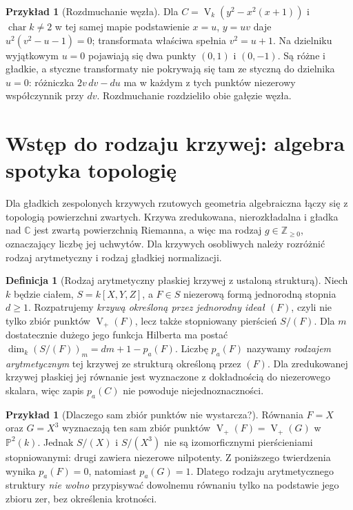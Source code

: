 \documentclass[11pt,a4paper,openany]{report}
\numberwithin{equation}{section}
\theoremstyle{plain}
\theoremstyle{definition}
\newtheorem{definicja}[twierdzenie]{Definicja}
\newtheorem{przyklad}[twierdzenie]{Przykład}
\theoremstyle{remark}
\newcommand{\Z}{\mathbb Z}
\newcommand{\C}{\mathbb C}
\newcommand{\PP}{\mathbb P}
\newcommand{\V}{\operatorname V}
\begin{document}
\begin{przyklad}[Rozdmuchanie węzła]
Dla $C=\V_k(y^2-x^2(x+1))$ i $\operatorname{char}k\ne2$
w tej samej mapie podstawienie $x=u$, $y=uv$ daje
$u^2(v^2-u-1)=0$; transformata właściwa spełnia
$v^2=u+1$. Na dzielniku wyjątkowym $u=0$ pojawiają się
dwa punkty $(0,1)$ i $(0,-1)$. Są różne i gładkie,
a styczne transformaty nie pokrywają się tam ze styczną
do dzielnika $u=0$: różniczka
$2v\,dv-du$ ma w każdym z tych punktów niezerowy
współczynnik przy $dv$. Rozdmuchanie rozdzieliło
obie gałęzie węzła.
\end{przyklad}

\section{Wstęp do rodzaju krzywej: algebra spotyka topologię}

Dla gładkich zespolonych krzywych rzutowych geometria
algebraiczna łączy się z topologią powierzchni zwartych.
Krzywa zredukowana, nierozkładalna i gładka nad $\C$
jest zwartą powierzchnią Riemanna, a więc ma rodzaj
$g\in\Z_{\ge0}$, oznaczający liczbę jej uchwytów.
Dla krzywych osobliwych należy rozróżnić rodzaj
arytmetyczny i rodzaj gładkiej normalizacji.

\begin{definicja}[Rodzaj arytmetyczny płaskiej krzywej z ustaloną strukturą]
Niech $k$ będzie ciałem, $S=k[X,Y,Z]$, a $F\in S$
niezerową formą jednorodną stopnia $d\ge1$.
Rozpatrujemy \emph{krzywą określoną przez jednorodny
ideał $(F)$}, czyli nie tylko zbiór punktów
$\V_+(F)$, lecz także stopniowany pierścień $S/(F)$.
Dla $m$ dostatecznie dużego jego funkcja Hilberta ma
postać $\dim_k(S/(F))_m=dm+1-p_a(F)$.
Liczbę $p_a(F)$ nazywamy \emph{rodzajem arytmetycznym}
tej krzywej ze strukturą określoną przez $(F)$.
Dla zredukowanej krzywej płaskiej jej równanie jest
wyznaczone z dokładnością do niezerowego skalara,
więc zapis $p_a(C)$ nie powoduje niejednoznaczności.
\end{definicja}

\begin{przyklad}[Dlaczego sam zbiór punktów nie wystarcza?]
Równania $F=X$ oraz $G=X^3$ wyznaczają ten sam
zbiór punktów $\V_+(F)=\V_+(G)$ w $\PP^2(k)$.
Jednak $S/(X)$ i $S/(X^3)$ nie są izomorficznymi
pierścieniami stopniowanymi: drugi zawiera niezerowe
nilpotenty. Z poniższego twierdzenia wynika
$p_a(F)=0$, natomiast $p_a(G)=1$.
Dlatego rodzaju arytmetycznego struktury \emph{nie wolno}
przypisywać dowolnemu równaniu tylko na podstawie
jego zbioru zer, bez określenia krotności.
\end{przyklad}
\end{document}
